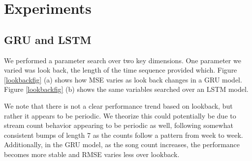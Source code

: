 \documentclass[11pt]{article}
\begin{document}
% 
% 
% 
% 
\section{Experiments}

\subsection{GRU and LSTM}

We performed a parameter search over two key dimensions. One parameter we varied was look back, the length of the time sequence provided which. Figure \ref{lookbackfig} (a) shows how MSE varies as look back changes in a GRU model. Figure \ref{lookbackfig} (b) shows the same variables searched over an LSTM model.

We note that there is not a clear performance trend based on lookback, but rather it appears to be periodic. We theorize this could potentially be due to stream count behavior appearing to be periodic as well, following somewhat consistent bumps of length 7 as the counts follow a pattern from week to week. Additionally, in the GRU model, as the song count increases, the performance becomes more stable and RMSE varies less over lookback. 
\end{document}
